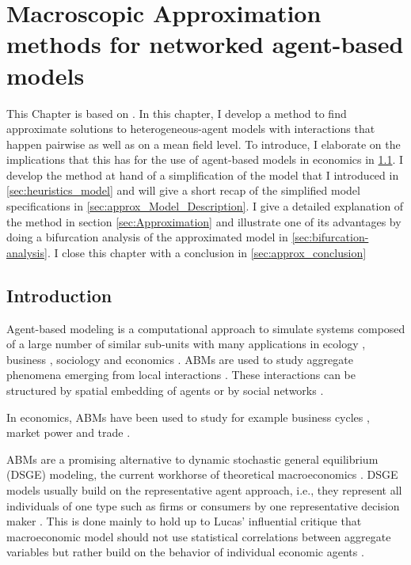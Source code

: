 \chapter{Macroscopic Approximation methods for networked agent-based models}
\label{chapter:approximation}

This Chapter is based on \citep[P5]{Kolb2019b}.
In this chapter, I develop a method to find approximate solutions to heterogeneous-agent models with interactions that happen pairwise as well as on a mean field level. To introduce, I elaborate on the implications that this has for the use of agent-based models in economics in \cref{sec:approx_intro}. I develop the method at hand of a simplification of the model that I introduced in \cref{sec:heuristics_model} and will give a short recap of the simplified model specifications in \cref{sec:approx_Model_Description}. I give a detailed explanation of the method in section \cref{sec:Approximation} and illustrate one of its advantages by doing a bifurcation analysis of the approximated model in \cref{sec:bifurcation-analysis}. I close this chapter with a conclusion in \cref{sec:approx_conclusion}


\section{Introduction}
\label{sec:approx_intro}

Agent-based modeling is a computational approach to simulate systems composed of a large number of similar sub-units with many applications in ecology \citep{Grimm2005}, business \citep{Bonabeau2002}, sociology \citep{Macy2002} and economics \citep{Tesfatsion2006, Hamill2015}.
ABMs are used to study aggregate phenomena emerging from local interactions \citep{Epstein1999}.
These interactions can be structured by spatial embedding of agents or by social networks \citep{Gross2008,Holme2006a,Bargigli2014}.

In economics, ABMs have been used to study for example business cycles \citep{DelliGatti2008}, market power \citep{Tesfatsion2006} and trade \citep{Hamill2015}.

ABMs are a promising alternative to dynamic stochastic general equilibrium (DSGE) modeling, the current workhorse of theoretical macroeconomics \citep{Farmer2009b}. 
DSGE models usually build on the representative agent approach, i.e., they represent all individuals of one type such as firms or consumers by one representative decision maker \citep{Hartley2002}. This is done mainly to hold up to Lucas' influential critique that macroeconomic model should not use statistical correlations between aggregate variables but rather build on the behavior of individual economic agents \citep{Janssen2016, Lucas1976}.

